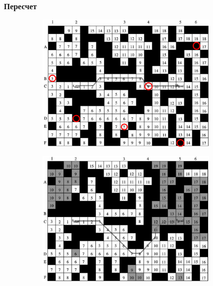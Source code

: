 \documentclass{beamer}
\begin{document}
    \begin{frame}
        \frametitle{Пересчет}
        \begin{figure}
            \centering
            \begin{subfigure}[b]{0.49\textwidth}
                \centering
                \includegraphics[width=\textwidth]{../figures/before-block.png}
            \end{subfigure}
            \hfill
            \begin{subfigure}[b]{0.49\textwidth}
                \centering
                \includegraphics[width=\textwidth]{../figures/after-block.png}
            \end{subfigure}
        \end{figure}

    \end{frame}
\end{document}
